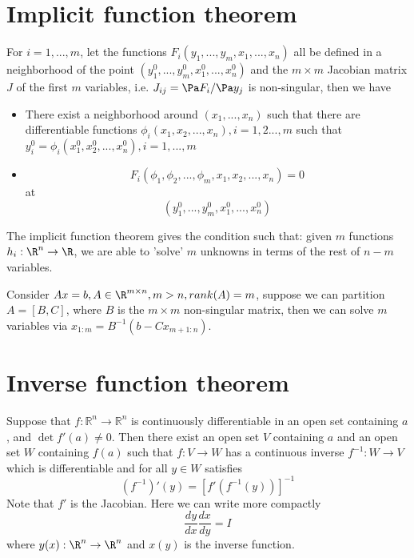 \begin{refsection}
\section{Implicit function theorem}
\begin{theorem}
\cite[112]{kaplan1973advanced}\cite[514]{luenberger2015linear} For $i=1,..., m$, let the functions $F_i (y_1,...,y_m,x_1,...,x_n)$ all be defined in a neighborhood of the point $(y_1^0,...,y_m^0,x_1^0,...,x_n^0)$ and the $m\times m$ Jacobian matrix $J$ of the first $m$ variables, i.e. $J_{ij} = \Pa F_i / \Pa y_j$ is non-singular, then we have
\begin{itemize}
    \item There exist a neighborhood around $(x_1,...,x_n)$ such that there are differentiable functions $\phi_i(x_1,x_2,...,x_n),i=1,2...,m$ such that $y_i^0 = \phi_i(x_1^0,x_2^0,...,x_n^0),i=1,...,m$
    \item $$F_i(\phi_1,\phi_2,...,\phi_m,x_1,x_2,...,x_n) = 0$$ at $$(y_1^0,...,y_m^0,x_1^0,...,x_n^0)$$
\end{itemize}
\end{theorem}


\begin{remark}[interpretation]
The implicit function theorem gives the condition such that: given $m$ functions $h_i:\R^n\to \R$, we are able to 'solve' $m$ unknowns in terms of the rest of $n-m$ variables.
\end{remark}

\begin{example}
Consider $Ax=b,A\in\R^{m\times n},m>n,rank(A)=m$, suppose we can partition $A = [B,C]$, where $B$ is the $m \times m$ non-singular matrix, then we can solve $m$ variables via $x_{1:m} = B^{-1}(b-Cx_{m+1:n})$.
\end{example}


\section{Inverse function theorem}
\begin{theorem}\cite{spivak}
Suppose that $f:\mathbb{R}^n\rightarrow \mathbb{R}^n$ is continuously differentiable in an open set containing $a$, and $\det f'(a) \neq 0$. Then there exist an open set $V$ containing $a$ and an open set $W$ containing $f(a)$ such that $f:V\rightarrow W$ has a continuous inverse $f^{-1}: W\rightarrow V$ which is differentiable and for all  $y \in W$ satisfies $$(f^{-1})'(y) = [f'(f^{-1}(y))]^{-1}$$
Note that $f'$ is the Jacobian. Here we can write more compactly
$$\frac{dy}{dx} \frac{dx}{dy} = I$$
where $y(x): \R^n\rightarrow\R^n$ and $x(y)$ is the inverse function.
\end{theorem}


\end{refsection}
